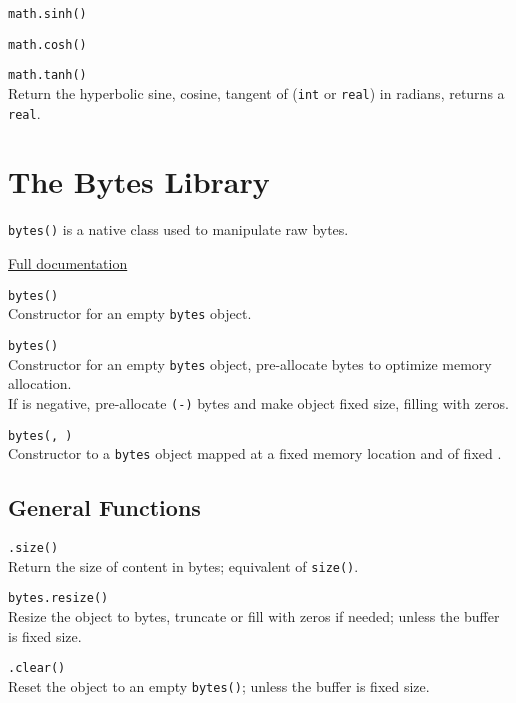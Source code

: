 \hangpar \texttt{math.sinh(}\texttt{)}

\hangpar \texttt{math.cosh(}\texttt{)}

\hangpar \texttt{math.tanh(}\texttt{)}\\
Return the hyperbolic sine, cosine, tangent of  (\texttt{int} or \texttt{real}) in radians, returns a \texttt{real}.

\section*{The Bytes Library}

\texttt{bytes()} is a native class used to manipulate raw bytes.

\hangpar \href{https://github.com/berry-lang/berry/wiki/Chapter-7\#bytes-class}{Full documentation}

\hangpar \texttt{bytes()}\\
Constructor for an empty \texttt{bytes} object.

\hangpar \texttt{bytes(}\texttt{)}\\
Constructor for an empty \texttt{bytes} object, pre-allocate  bytes to optimize memory allocation.\\
If  is negative, pre-allocate \texttt{(-}\texttt{)} bytes and make object fixed size, filling with zeros.

\hangpar \texttt{bytes(}\texttt{, }\texttt{)}\\
Constructor to a \texttt{bytes} object mapped at a fixed memory location  and of fixed . 

\subsection*{General Functions}

\hangpar {}\texttt{.size()}\\
Return the size of content in bytes; equivalent of \texttt{size(}\texttt{)}.

\hangpar \texttt{bytes.resize(}\texttt{)} \\
Resize the object to  bytes, truncate or fill with zeros if needed; unless the buffer is fixed size.

\hangpar {}\texttt{.clear()}\\
Reset the object to an empty \texttt{bytes()}; unless the buffer is fixed size.

